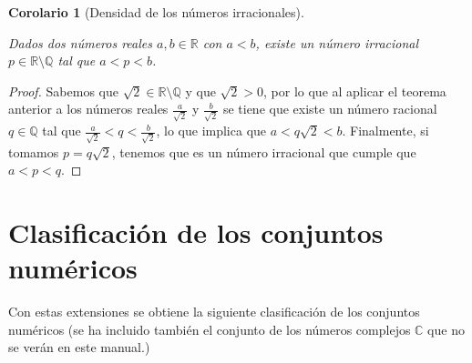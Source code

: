 \documentclass[
  a4paper,
]{scrreport}
\theoremstyle{plain}
\newtheorem{corollary}{Corolario}[chapter]
\theoremstyle{plain}
\theoremstyle{definition}
\theoremstyle{definition}
\theoremstyle{plain}
\theoremstyle{definition}
\theoremstyle{remark}
\begin{document}
\begin{corollary}[Densidad de los números
irracionales]\protect\hypertarget{cor-densidad-irracionales}{}\label{cor-densidad-irracionales}

Dados dos números reales \(a,b\in \mathbb{R}\) con \(a<b\), existe un
número irracional \(p\in \mathbb{R}\setminus \mathbb{Q}\) tal que
\(a<p<b\).

\end{corollary}

\begin{tcolorbox}[enhanced jigsaw, rightrule=.15mm, toptitle=1mm, colbacktitle=quarto-callout-note-color!10!white, bottomrule=.15mm, opacityback=0, arc=.35mm, breakable, toprule=.15mm, left=2mm, coltitle=black, colback=white, opacitybacktitle=0.6, titlerule=0mm, colframe=quarto-callout-note-color-frame, bottomtitle=1mm, title=\textcolor{quarto-callout-note-color}{\faInfo}\hspace{0.5em}{Demostración}, leftrule=.75mm]

\begin{proof}

Sabemos que \(\sqrt{2}\in \mathbb{R}\setminus\mathbb{Q}\) y que
\(\sqrt{2}>0\), por lo que al aplicar el teorema anterior a los números
reales \(\frac{a}{\sqrt{2}}\) y \(\frac{b}{\sqrt{2}}\) se tiene que
existe un número racional \(q\in\mathbb{Q}\) tal que
\(\frac{a}{\sqrt{2}}<q<\frac{b}{\sqrt{2}}\), lo que implica que
\(a<q\sqrt{2}<b\). Finalmente, si tomamos \(p=q\sqrt{2}\), tenemos que
es un número irracional que cumple que \(a<p<q\).

\end{proof}

\end{tcolorbox}

\hypertarget{clasificaciuxf3n-de-los-conjuntos-numuxe9ricos}{%
\section{Clasificación de los conjuntos
numéricos}\label{clasificaciuxf3n-de-los-conjuntos-numuxe9ricos}}

Con estas extensiones se obtiene la siguiente clasificación de los
conjuntos numéricos (se ha incluido también el conjunto de los números
complejos \(\mathbb{C}\) que no se verán en este manual.)
\end{document}
